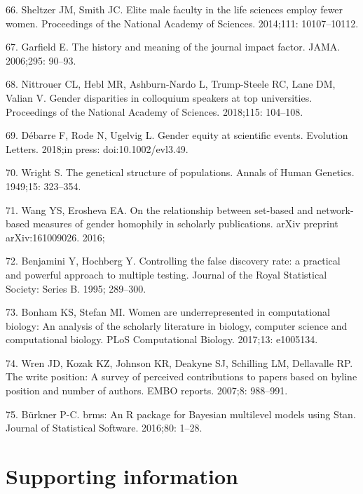 \documentclass[12pt,]{article}
\begin{document}
\hypertarget{ref-sheltzer_2014}{}
66. Sheltzer JM, Smith JC. Elite male faculty in the life sciences
employ fewer women. Proceedings of the National Academy of Sciences.
2014;111: 10107--10112.

\hypertarget{ref-Garfield_2006}{}
67. Garfield E. The history and meaning of the journal impact factor.
JAMA. 2006;295: 90--93.

\hypertarget{ref-nittrouer_2018}{}
68. Nittrouer CL, Hebl MR, Ashburn-Nardo L, Trump-Steele RC, Lane DM,
Valian V. Gender disparities in colloquium speakers at top universities.
Proceedings of the National Academy of Sciences. 2018;115: 104--108.

\hypertarget{ref-debarre_2018}{}
69. Débarre F, Rode N, Ugelvig L. Gender equity at scientific events.
Evolution Letters. 2018;in press: doi:10.1002/evl3.49.

\hypertarget{ref-wright_1949}{}
70. Wright S. The genetical structure of populations. Annals of Human
Genetics. 1949;15: 323--354.

\hypertarget{ref-wang_2016}{}
71. Wang YS, Erosheva EA. On the relationship between set-based and
network-based measures of gender homophily in scholarly publications.
arXiv preprint arXiv:161009026. 2016;

\hypertarget{ref-Benjamini_1995}{}
72. Benjamini Y, Hochberg Y. Controlling the false discovery rate: a
practical and powerful approach to multiple testing. Journal of the
Royal Statistical Society: Series B. 1995; 289--300.

\hypertarget{ref-Bonham_2017}{}
73. Bonham KS, Stefan MI. Women are underrepresented in computational
biology: An analysis of the scholarly literature in biology, computer
science and computational biology. PLoS Computational Biology. 2017;13:
e1005134.

\hypertarget{ref-Wren_2007}{}
74. Wren JD, Kozak KZ, Johnson KR, Deakyne SJ, Schilling LM, Dellavalle
RP. The write position: A survey of perceived contributions to papers
based on byline position and number of authors. EMBO reports. 2007;8:
988--991.

\hypertarget{ref-burkner_2016}{}
75. Bürkner P-C. brms: An R package for Bayesian multilevel models using
Stan. Journal of Statistical Software. 2016;80: 1--28.

\newpage

\section{Supporting information}\label{supporting-information}
\end{document}
